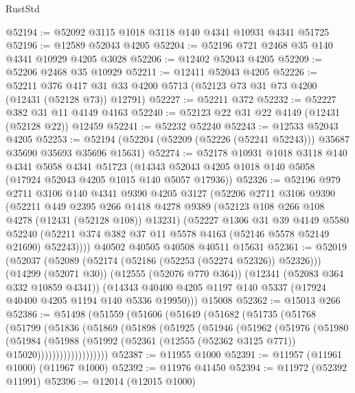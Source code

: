 \begin{lexlean}{RustStd}
\begin{coremodule}
@52194 := @52092 @3115 @1018 @3118 @140 @4341 @10931 @4341 @51725
@52196 := @12589 @52043 @4205
@52204 := @52196 @721 @2468 @35 @140 @4341 @10929 @4205 @3028
@52206 := @12402 @52043 @4205
@52209 := @52206 @2468 @35 @10929
@52211 := @12411 @52043 @4205
@52226 := @52211
    @376
    @417
    @31
    @33
    @4200
    @5713
    (@52123 @73 @31 @73 @4200 (@12431 (@52128 @73)) @12791)
@52227 := @52211 @372
@52232 := @52227 @382 @31 @11 @4149 @4163
@52240 := @52123 @22 @31 @22 @4149 (@12431 (@52128 @22)) @12459
@52241 := @52232 @52240
@52243 := @12533 @52043 @4205
@52253 := @52194 (@52204 (@52209 (@52226 (@52241 @52243))) @35687 @35690 @35693 @35696 @15631)
@52274 := @52178
    @10931
    @1018
    @3118
    @140
    @4341
    @5058
    @4341
    @51723
    (@14343 @52043 @4205 @1018 @140 @5058 (@17924 @52043 @4205 @1015 @140 @5057 @17936))
@52326 := @52196
    @979
    @2711
    @3106
    @140
    @4341
    @9390
    @4205
    @3127
    (@52206
      @2711
      @3106
      @9390
      (@52211
        @449
        @2395
        @266
        @1418
        @4278
        @9389
        (@52123 @108 @266 @108 @4278 (@12431 (@52128 @108)) @13231)
        (@52227
          @1306
          @31
          @39
          @4149
          @5580
          @52240
          (@52211 @374 @382 @37 @11 @5578 @4163 (@52146 @5578 @52149 @21690) @52243))))
    @40502
    @40505
    @40508
    @40511
    @15631
@52361 := @52019
    (@52037
      (@52089 (@52174 (@52186 (@52253 (@52274 @52326)) @52326)))
      (@14299 (@52071 @30))
      (@12555 (@52076 @770 @364))
      (@12341 (@52083 @364 @332 @10859 @4341))
      (@14343 @40400 @4205 @1197 @140 @5337 (@17924 @40400 @4205 @1194 @140 @5336 @19950)))
    @15008
@52362 := @15013 @266
@52386 := @51498
    (@51559
      (@51606
        (@51649
          (@51682
            (@51735
              (@51768
                (@51799
                  (@51836
                    (@51869
                      (@51898
                        (@51925
                          (@51946
                            (@51962
                              (@51976
                                (@51980
                                  (@51984
                                    (@51988
                                      (@51992
                                        (@52361
                                          (@12555 (@52362 @3125 @771))
                                          @15020)))))))))))))))))))
@52387 := @11955 @1000
@52391 := @11957 (@11961 @1000) (@11967 @1000)
@52392 := @11976 @41450
@52394 := @11972 (@52392 @11991)
@52396 := @12014 (@12015 @1000)

\end{coremodule}
\end{lexlean}
